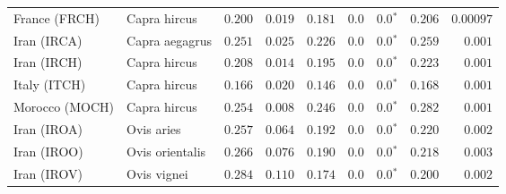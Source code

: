 \begin{center}
\begin{adjustbox}{width = 1\textwidth}
\begin{tabular}{|l|l|r|r|r|r|r|r|r|}
                  France (FRCH) &         Capra hircus &                                        $ 0.200$ &                                           $ 0.019$ &                      $ 0.181$ &            $0.0$ &                  $\bm{0.0{^*}}$ &                                           $ 0.206$ &          $0.00097$ \\
                    Iran (IRCA) &       Capra aegagrus &                                        $ 0.251$ &                                           $ 0.025$ &                      $ 0.226$ &            $0.0$ &                  $\bm{0.0{^*}}$ &                                           $ 0.259$ &           $ 0.001$ \\
                    Iran (IRCH) &         Capra hircus &                                        $ 0.208$ &                                           $ 0.014$ &                      $ 0.195$ &            $0.0$ &                  $\bm{0.0{^*}}$ &                                           $ 0.223$ &           $ 0.001$ \\
                   Italy (ITCH) &         Capra hircus &                                        $ 0.166$ &                                           $ 0.020$ &                      $ 0.146$ &            $0.0$ &                  $\bm{0.0{^*}}$ &                                           $ 0.168$ &           $ 0.001$ \\
                 Morocco (MOCH) &         Capra hircus &                                        $ 0.254$ &                                           $ 0.008$ &                      $ 0.246$ &            $0.0$ &                  $\bm{0.0{^*}}$ &                                           $ 0.282$ &           $ 0.001$ \\
                    Iran (IROA) &           Ovis aries &                                        $ 0.257$ &                                           $ 0.064$ &                      $ 0.192$ &            $0.0$ &                  $\bm{0.0{^*}}$ &                                           $ 0.220$ &           $ 0.002$ \\
                    Iran (IROO) &      Ovis orientalis &                                        $ 0.266$ &                                           $ 0.076$ &                      $ 0.190$ &            $0.0$ &                  $\bm{0.0{^*}}$ &                                           $ 0.218$ &           $ 0.003$ \\
                    Iran (IROV) &          Ovis vignei &                                        $ 0.284$ &                                           $ 0.110$ &                      $ 0.174$ &            $0.0$ &                  $\bm{0.0{^*}}$ &                                           $ 0.200$ &           $ 0.002$ \\

\end{tabular}
\end{adjustbox}
\end{center}
